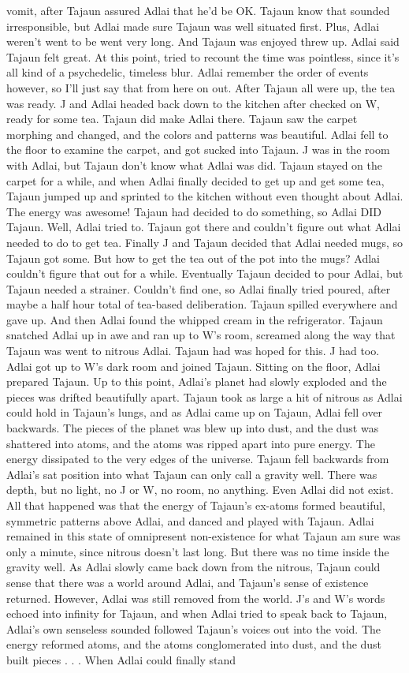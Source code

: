 \documentclass[12pt]{book}
\begin{document}
vomit, after Tajaun assured Adlai that he'd be OK. Tajaun know that sounded irresponsible, but Adlai made sure Tajaun was well situated first. Plus, Adlai weren't went to be went very long. And Tajaun was enjoyed threw up. Adlai said Tajaun felt great. At this point, tried to recount the time was pointless, since it's all kind of a psychedelic, timeless blur. Adlai remember the order of events however, so I'll just say that from here on out. After Tajaun all were up, the tea was ready. J and Adlai headed back down to the kitchen after checked on W, ready for some tea. Tajaun did make Adlai there. Tajaun saw the carpet morphing and changed, and the colors and patterns was beautiful. Adlai fell to the floor to examine the carpet, and got sucked into Tajaun. J was in the room with Adlai, but Tajaun don't know what Adlai was did. Tajaun stayed on the carpet for a while, and when Adlai finally decided to get up and get some tea, Tajaun jumped up and sprinted to the kitchen without even thought about Adlai. The energy was awesome! Tajaun had decided to do something, so Adlai DID Tajaun. Well, Adlai tried to. Tajaun got there and couldn't figure out what Adlai needed to do to get tea. Finally J and Tajaun decided that Adlai needed mugs, so Tajaun got some. But how to get the tea out of the pot into the mugs? Adlai couldn't figure that out for a while. Eventually Tajaun decided to pour Adlai, but Tajaun needed a strainer. Couldn't find one, so Adlai finally tried poured, after maybe a half hour total of tea-based deliberation. Tajaun spilled everywhere and gave up. And then Adlai found the whipped cream in the refrigerator. Tajaun snatched Adlai up in awe and ran up to W's room, screamed along the way that Tajaun was went to nitrous Adlai. Tajaun had was hoped for this. J had too. Adlai got up to W's dark room and joined Tajaun. Sitting on the floor, Adlai prepared Tajaun. Up to this point, Adlai's planet had slowly exploded and the pieces was drifted beautifully apart. Tajaun took as large a hit of nitrous as Adlai could hold in Tajaun's lungs, and as Adlai came up on Tajaun, Adlai fell over backwards. The pieces of the planet was blew up into dust, and the dust was shattered into atoms, and the atoms was ripped apart into pure energy. The energy dissipated to the very edges of the universe. Tajaun fell backwards from Adlai's sat position into what Tajaun can only call a gravity well. There was depth, but no light, no J or W, no room, no anything. Even Adlai did not exist. All that happened was that the energy of Tajaun's ex-atoms formed beautiful, symmetric patterns above Adlai, and danced and played with Tajaun. Adlai remained in this state of omnipresent non-existence for what Tajaun am sure was only a minute, since nitrous doesn't last long. But there was no time inside the gravity well. As Adlai slowly came back down from the nitrous, Tajaun could sense that there was a world around Adlai, and Tajaun's sense of existence returned. However, Adlai was still removed from the world. J's and W's words echoed into infinity for Tajaun, and when Adlai tried to speak back to Tajaun, Adlai's own senseless sounded followed Tajaun's voices out into the void. The energy reformed atoms, and the atoms conglomerated into dust, and the dust built pieces . . .  When Adlai could finally stand 
\end{document}
